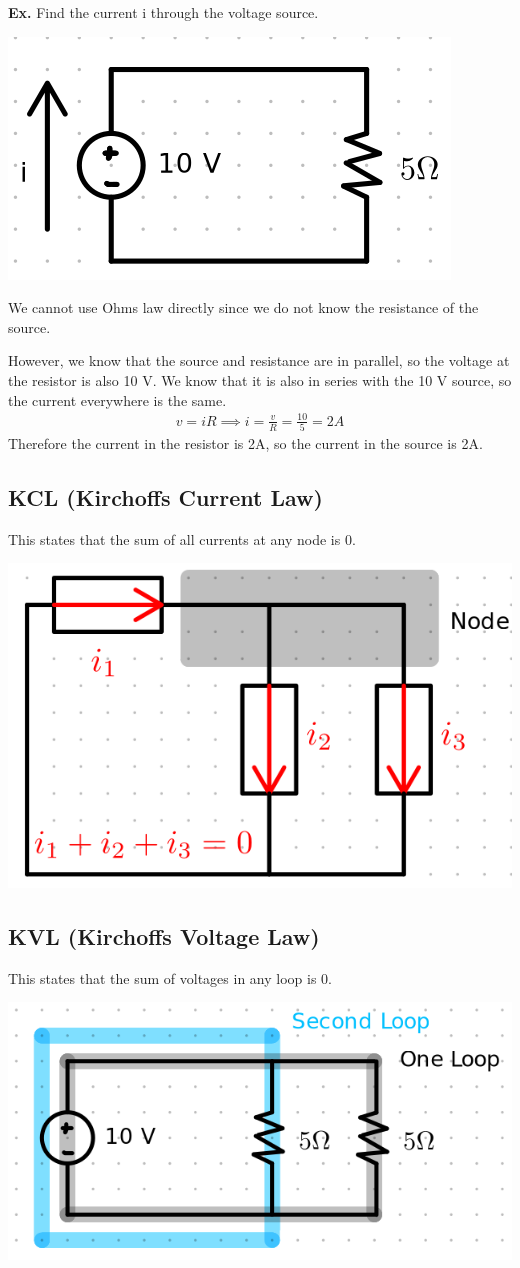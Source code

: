 \documentclass[12pt,letterpaper]{article} \usepackage{amsmath} \usepackage{graphicx} \usepackage[margin=1in]{geometry} \usepackage{longtable}  \usepackage{amssymb}
\begin{document}
	\begin{mdframed}[]
	\textbf{Ex.} Find the current i through the voltage source.
	\begin{center}
		\includegraphics[width=0.35\linewidth]{ex1}
	\end{center}
	We cannot use Ohms law directly since we do not know the resistance of the source.
	
	However, we know that the source and resistance are in parallel, so the voltage at the resistor is also 10 V. We know that it is also in series with the 10 V source, so the current everywhere is the same. 
	\begin{align*}
		v=iR \implies i=\frac{v}{R} = \frac{10}{5} = 2A
	\end{align*}
	Therefore the current in the resistor is 2A, so the current in the source is 2A.
	
	\end{mdframed}
	
	\subsection{KCL (Kirchoffs Current Law)}
	This states that the sum of all currents at any node is 0.
	\begin{center}
		\includegraphics[width=0.4\linewidth]{meshcurrents}
	\end{center}
	
	
	\subsection{KVL (Kirchoffs Voltage Law)}
	This states that the sum of voltages in any loop is 0.
	\begin{center}
		\includegraphics[width=0.4\linewidth]{loop}
	\end{center}
	
\end{document}
